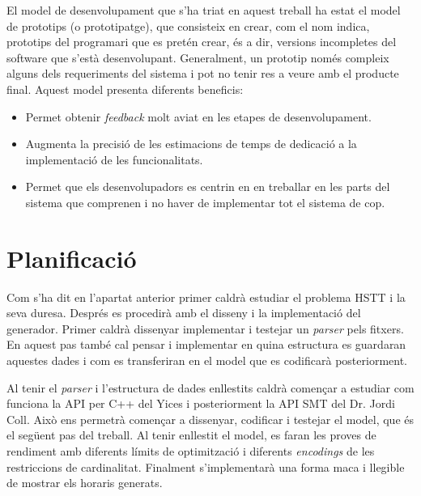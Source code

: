 \documentclass[11pt,a4paper,twoside]{report}
\begin{document}
  El model de desenvolupament que s'ha triat en aquest treball ha estat el model de prototips (o prototipatge), 
  que consisteix en crear, com el nom indica, prototips del programari que es pretén crear, és a dir, versions incompletes del software que s'està desenvolupant.
  Generalment, un prototip només compleix alguns dels requeriments del sistema i pot no tenir res a veure amb el producte final. Aquest model presenta diferents beneficis:
  \begin{itemize}
    \item Permet obtenir \textit{feedback} molt aviat en les etapes de desenvolupament.
    \item Augmenta la precisió de les estimacions de temps de dedicació a la implementació de les funcionalitats. 
    \item Permet que els desenvolupadors es centrin en en treballar en les parts del sistema que comprenen i no haver de implementar tot el sistema de cop.
  \end{itemize}



  \section{Planificació}

  Com s'ha dit en l'apartat anterior primer caldrà estudiar el problema HSTT i la seva duresa. 
  Després es procedirà amb el disseny i la implementació del generador. Primer caldrà dissenyar implementar i testejar un \textit{parser} pels fitxers. En aquest pas també cal pensar i implementar en quina estructura es guardaran aquestes dades i com es transferiran en el model que es codificarà posteriorment. 

  Al tenir el \textit{parser} i l'estructura de dades enllestits caldrà començar a estudiar com funciona la API per C++ del Yices i 
  posteriorment la API SMT del Dr. Jordi Coll. Això ens permetrà començar a dissenyar, codificar i testejar el model, que és el següent pas del treball. 
  Al tenir enllestit el model, es faran les proves de rendiment amb diferents límits de optimització i diferents \textit{encodings} de les restriccions de cardinalitat.
  Finalment s'implementarà una forma maca i llegible de mostrar els horaris generats.
  
\end{document}
